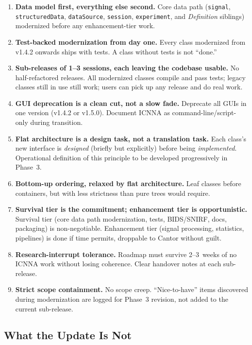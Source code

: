 \documentclass[11pt,a4paper]{article}
\begin{document}
\begin{enumerate}[label=\textbf{P\arabic*.}]
    \item \textbf{Data model first, everything else second.} Core data path (\texttt{signal}, \texttt{structuredData}, \texttt{dataSource}, \texttt{session}, \texttt{experiment}, and \emph{Definition} siblings) modernized before any enhancement-tier work.
    \item \textbf{Test-backed modernization from day one.} Every class modernized from v1.4.2 onwards ships with tests. A class without tests is not ``done.''
    \item \textbf{Sub-releases of 1--3 sessions, each leaving the codebase usable.} No half-refactored releases. All modernized classes compile and pass tests; legacy classes still in use still work; users can pick up any release and do real work.
    \item \textbf{GUI deprecation is a clean cut, not a slow fade.} Deprecate all GUIs in one version (v1.4.2 or v1.5.0). Document ICNNA as command-line/script-only during transition.
    \item \textbf{Flat architecture is a design task, not a translation task.} Each class's new interface is \emph{designed} (briefly but explicitly) before being \emph{implemented}. Operational definition of this principle to be developed progressively in Phase~3.
    \item \textbf{Bottom-up ordering, relaxed by flat architecture.} Leaf classes before containers, but with less strictness than pure trees would require.
    \item \textbf{Survival tier is the commitment; enhancement tier is opportunistic.} Survival tier (core data path modernization, tests, BIDS/SNIRF, docs, packaging) is non-negotiable. Enhancement tier (signal processing, statistics, pipelines) is done if time permits, droppable to Cantor without guilt.
    \item \textbf{Research-interrupt tolerance.} Roadmap must survive 2--3~weeks of no ICNNA work without losing coherence. Clear handover notes at each sub-release.
    \item \textbf{Strict scope containment.} No scope creep. ``Nice-to-have'' items discovered during modernization are logged for Phase~3 revision, not added to the current sub-release.
\end{enumerate}

\subsection{What the Update Is Not}
\end{document}
